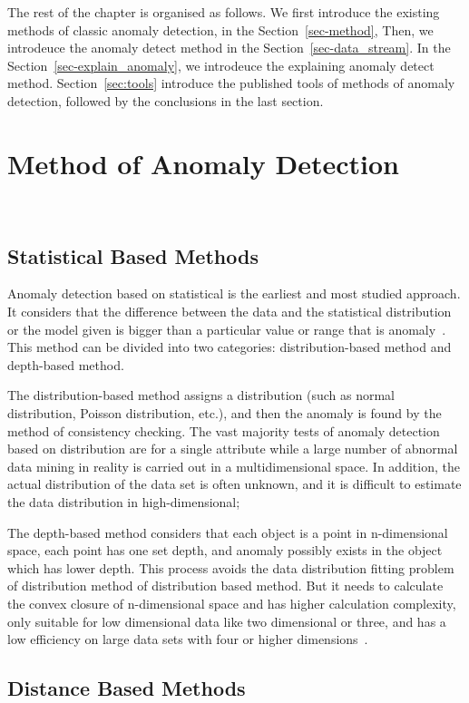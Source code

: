 The rest of the chapter is organised as follows.
We first introduce the existing methods of classic anomaly detection,
in the Section~\ref{sec-method},
Then,
we introdeuce the anomaly detect method in the Section~\ref{sec-data_stream}.
In the Section~\ref{sec-explain_anomaly},
we introdeuce the explaining anomaly detect method.
Section~\ref{sec:tools} introduce the published tools of
methods of anomaly detection,
followed by the conclusions in the last section.

\section{Method of Anomaly Detection}~\label{sec-method}

\subsection{Statistical Based Methods}

Anomaly detection based on statistical is the earliest and
most studied approach.
It considers that the difference
between the data and the statistical distribution or the model
given is bigger than a particular value or range that is
anomaly~\cite{chandola2009anomaly}.
This method can be divided into two
categories: distribution-based method and depth-based
method.

The distribution-based method assigns a distribution (such as
normal distribution,
Poisson distribution,
etc.),
and then the anomaly is found by the method of consistency checking.
The vast majority tests of anomaly detection based on
distribution are for a single attribute while a large number
of abnormal data mining in reality is carried out in a
multidimensional space.
In addition,
the actual distribution of the data set is often unknown,
and it is difficult to
estimate the data distribution in high-dimensional;


The depth-based method considers that
each object is a point in n-dimensional space,
each point has one set depth,
and anomaly possibly exists in the object which has lower depth.
This process avoids the data distribution fitting problem of
distribution method of distribution based method.
But it needs to calculate
the convex closure of n-dimensional space and has higher
calculation complexity,
only suitable for low dimensional
data like two dimensional or three,
and has a low efficiency
on large data sets with four or higher dimensions~\cite{ruts1996computing}.

\subsection{Distance Based Methods}

